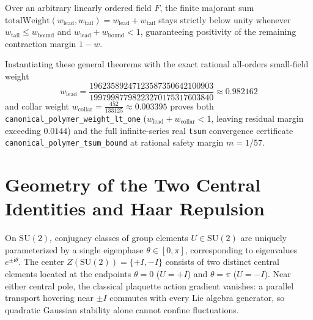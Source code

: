 \documentclass[11pt,a4paper]{article}
\newcommand{\SU}{\mathrm{SU}}
\begin{document}
Over an arbitrary linearly ordered field $F$, the finite majorant sum $\mathrm{totalWeight}(w_{\mathrm{lead}}, w_{\mathrm{tail}}) = w_{\mathrm{lead}} + w_{\mathrm{tail}}$ stays strictly below unity whenever $w_{\mathrm{tail}} \le w_{\mathrm{bound}}$ and $w_{\mathrm{lead}} + w_{\mathrm{bound}} < 1$, guaranteeing positivity of the remaining contraction margin $1 - w$.

Instantiating these general theorems with the exact rational all-orders small-field weight
\begin{equation}
w_{\mathrm{lead}} = \frac{19623589247123587350642100903}{19979987798223270175317603840} \approx 0.982162
\end{equation}
and collar weight $w_{\mathrm{collar}} = \frac{452}{133125} \approx 0.003395$ proves both \texttt{canonical\_\-polymer\_\-weight\_\-lt\_\-one} ($w_{\mathrm{lead}} + w_{\mathrm{collar}} < 1$, leaving residual margin exceeding $0.0144$) and the full infinite-series real \texttt{tsum} convergence certificate \texttt{canonical\_\-polymer\_\-tsum\_\-bound} at rational safety margin $m = 1/57$.

\section{Geometry of the Two Central Identities and Haar Repulsion}
On $\SU(2)$, conjugacy classes of group elements $U \in \SU(2)$ are uniquely parameterized by a single eigenphase $\theta \in [0, \pi]$, corresponding to eigenvalues $e^{\pm \mathrm{i}\theta}$. The center $Z(\SU(2)) = \{+I, -I\}$ consists of two distinct central elements located at the endpoints $\theta = 0$ ($U = +I$) and $\theta = \pi$ ($U = -I$). Near either central pole, the classical plaquette action gradient vanishes: a parallel transport hovering near $\pm I$ commutes with every Lie algebra generator, so quadratic Gaussian stability alone cannot confine fluctuations.
\end{document}
